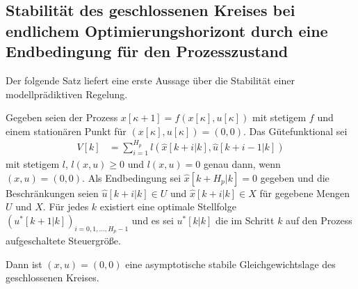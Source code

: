 \subsection{Stabilität des geschlossenen Kreises bei endlichem Optimierungshorizont durch eine Endbedingung für den Prozesszustand}
\label{subsec:kap_4_stab_geschl_rk}
Der folgende Satz liefert eine erste Aussage über die Stabilität einer modellprädiktiven Regelung.
\begin{satz}\label{satz:kap_4_stabilitaet}
Gegeben seien der Prozess $x[\kappa +1]=f(x[\kappa],u[\kappa])$ mit stetigem $f$ und einem stationären Punkt für $(x[\kappa],u[\kappa])=(0,0)$. Das Gütefunktional sei
\begin{align*}
	V[k] & = \sum\limits_{i=1}^{H_p}l\left( \hat{x}[k+i|k],\hat{u}[k+i-1|k] \right)
\end{align*}
mit stetigem $l$, $l(x,u)\ge 0$ und $l(x,u)=0$ genau dann, wenn $(x,u)=(0,0)$. Als Endbedingung sei $\hat{x}[k+H_p|k]=0$ gegeben und die
Beschränkungen seien $\hat{u}[k+i|k]\in U$ und $\hat{x}[k+i|k]\in X$ für gegebene Mengen $U$ und $X$. Für jedes $k$ existiert eine optimale Stellfolge $\left(u^{\ast}[k+1|k]\right)_{i=0,1,\ldots,H_p-1}$ und es sei $u^{\ast}[k|k]$
die im Schritt $k$ auf den Prozess aufgeschaltete Steuergröße.

Dann ist $(x,u)=(0,0)$ eine asymptotische stabile Gleichgewichtslage des geschlossenen Kreises.
\end{satz}
